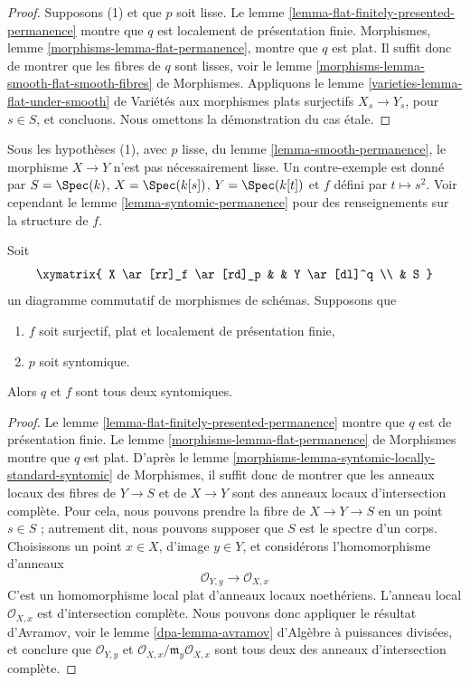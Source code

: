 \begin{proof}
Supposons (1) et que $p$ soit lisse. Le lemme
\ref{lemma-flat-finitely-presented-permanence} montre que $q$ est localement de
présentation finie. Morphismes, lemme
\ref{morphisms-lemma-flat-permanence}, montre que $q$ est plat.
Il suffit donc de montrer que les fibres de $q$ sont lisses, voir le lemme
\ref{morphisms-lemma-smooth-flat-smooth-fibres} de Morphismes.
Appliquons le lemme \ref{varieties-lemma-flat-under-smooth} de Variétés aux
morphismes plats surjectifs $X_s \to Y_s$, pour $s \in S$, et concluons.
Nous omettons la démonstration du cas \'etale.
\end{proof}

\begin{remark}
\label{remark-smooth-permanence}
Sous les hypothèses (1), avec $p$ lisse, du lemme
\ref{lemma-smooth-permanence}, le morphisme $X \to Y$ n'est pas nécessairement
lisse. Un contre-exemple est donné par $S = \Spec(k)$,
$X = \Spec(k[s])$, $Y = \Spec(k[t])$ et $f$ défini par
$t \mapsto s^2$. Voir cependant le lemme
\ref{lemma-syntomic-permanence} pour des renseignements sur la structure de
$f$.
\end{remark}

\begin{lemma}
\label{lemma-syntomic-permanence}
Soit
$$
\xymatrix{
X \ar[rr]_f \ar[rd]_p & &
Y \ar[dl]^q \\
& S
}
$$
un diagramme commutatif de morphismes de schémas. Supposons que
\begin{enumerate}
\item $f$ soit surjectif, plat et localement de présentation finie,
\item $p$ soit syntomique.
\end{enumerate}
Alors $q$ et $f$ sont tous deux syntomiques.
\end{lemma}

\begin{proof}
Le lemme \ref{lemma-flat-finitely-presented-permanence} montre que $q$
est de présentation finie. Le lemme
\ref{morphisms-lemma-flat-permanence} de Morphismes
montre que $q$ est plat.
D'après le lemme
\ref{morphisms-lemma-syntomic-locally-standard-syntomic} de Morphismes,
il suffit donc de montrer que les anneaux locaux des fibres de
$Y \to S$ et de $X \to Y$ sont des anneaux locaux d'intersection
complète. Pour cela, nous pouvons prendre la fibre de
$X \to Y \to S$ en un point $s \in S$ ; autrement dit, nous pouvons
supposer que $S$ est le spectre d'un corps. Choisissons un point
$x \in X$, d'image $y \in Y$, et considérons l'homomorphisme d'anneaux
$$
\mathcal{O}_{Y, y} \longrightarrow \mathcal{O}_{X, x}
$$
C'est un homomorphisme local plat d'anneaux locaux noethériens.
L'anneau local $\mathcal{O}_{X, x}$ est d'intersection complète.
Nous pouvons donc appliquer le résultat d'Avramov, voir le lemme
\ref{dpa-lemma-avramov} d'Algèbre à puissances divisées, et conclure que
$\mathcal{O}_{Y, y}$ et
$\mathcal{O}_{X, x}/\mathfrak m_y\mathcal{O}_{X, x}$ sont tous deux
des anneaux d'intersection complète.
\end{proof}

